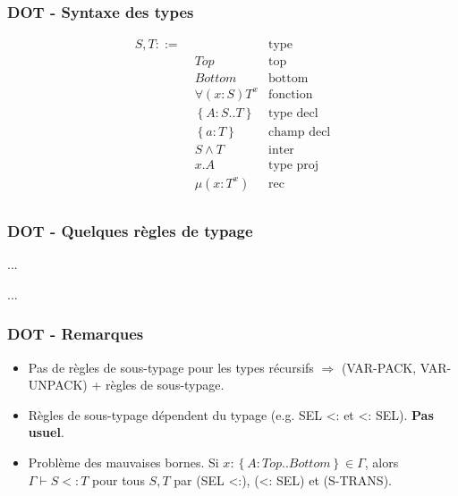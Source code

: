 \documentclass{beamer}
\begin{document}
\begin{frame}
  \frametitle{DOT - Syntaxe des types}
  \begin{align*}
    S, T ::= & \, & \text{type} \\
             & \; Top & \text{top} \\
             & \; Bottom & \text{bottom} \\
             & \; \forall(x : S) T^{x} & \text{fonction} \\
             & \; \left\{ A : S .. T \right\} & \text{type decl} \\
             & \; \left\{ a : T \right\} & \text{champ decl} \\
             & \; S \wedge T & \text{inter} \\
             & \; x.A & \text{type proj} \\
             & \; \mu(x : T^{x}) & \text{rec} \\
  \end{align*}
\end{frame} 


\begin{frame}
  \frametitle{DOT - Quelques règles de typage}
  \begin{center}
    \Huge{...}
  \end{center}
  \begin{center}
    \Huge{...}
  \end{center}
\end{frame}

%

\begin{frame}
  \frametitle{DOT - Remarques}
  \begin{itemize}
  \item Pas de règles de sous-typage pour les types récursifs $\Rightarrow$
    (VAR-PACK, VAR-UNPACK) + règles de sous-typage.
  \item Règles de sous-typage dépendent du typage (e.g. SEL <: et <: SEL). \textbf{Pas usuel}.
  \item Problème des mauvaises bornes. Si $x : \left\{ A : Top .. Bottom
    \right\} \in \Gamma$, alors $\Gamma \vdash S <: T$ pour tous $S, T$ par (SEL <:),
    (<: SEL) et (S-TRANS).
  \end{itemize}
\end{frame}
\end{document}
